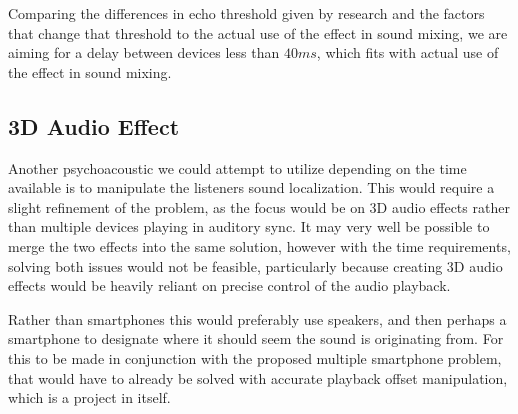 Comparing the differences in echo threshold given by research and the factors that change that threshold to the actual use of the effect in sound mixing, we are aiming for a delay between devices less than $40 ms$, which fits with actual use of the effect in sound mixing.

\subsection{3D Audio Effect}
Another psychoacoustic we could attempt to utilize depending on the time available is to manipulate the listeners sound localization.
This would require a slight refinement of the problem, as the focus would be on 3D audio effects rather than multiple devices playing in auditory sync.
It may very well be possible to merge the two effects into the same solution, however with the time requirements, solving both issues would not be feasible, particularly because creating 3D audio effects would be heavily reliant on precise control of the audio playback.

Rather than smartphones this would preferably use speakers, and then perhaps a smartphone to designate where it should seem the sound is originating from.
For this to be made in conjunction with the proposed multiple smartphone problem, that would have to already be solved with accurate playback offset manipulation, which is a project in itself.
